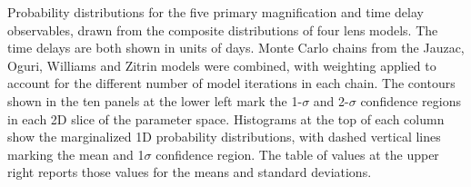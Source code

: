Probability distributions for the five primary magnification and time delay observables, drawn from the composite distributions of four lens models.  The time delays are both shown in units of days. Monte Carlo chains from the Jauzac, Oguri, Williams and Zitrin models were combined, with weighting applied to account for the different number of model iterations in each chain.  The contours shown in the ten panels at the lower left mark the 1-$\sigma$ and 2-$\sigma$ confidence regions in each 2D slice of the parameter space. Histograms at the top of each column show the marginalized 1D probability distributions, with dashed vertical lines marking the mean and 1$\sigma$ confidence region.   The table of values at the upper right reports those values for the means and standard deviations.
\label{fig:LensModelContours}